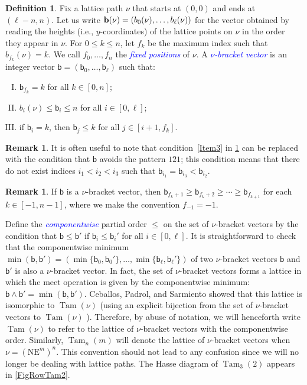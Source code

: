 \documentclass[11pt]{amsart}
\theoremstyle{definition}
\newtheorem{definition}[theorem]{Definition}
\newtheorem{remark}[theorem]{Remark}
\DeclareMathOperator{\Tam}{Tam}
\newcommand{\dfn}[1]{\textcolor{blue}{\emph{#1}}}
\begin{document}
\begin{definition}\label{DefMeet2}
Fix a lattice path $\nu$ that starts at $(0,0)$ and ends at $(\ell-n,n)$. Let us write ${{\bf b}(\nu)=(b_0(\nu),\ldots,b_{\ell}(\nu))}$ for the vector obtained by reading the heights (i.e., $y$-coordinates) of the lattice points on $\nu$ in the order they appear in $\nu$. For $0\leq k\leq n$, let $f_k$ be the maximum index such that $b_{f_k}(\nu)=k$. We call $f_0,\ldots,f_n$ the \dfn{fixed positions} of $\nu$. A \dfn{$\nu$-bracket vector} is an integer vector $\mathsf{b}=(\mathsf b_0,\ldots,\mathsf b_{\ell})$ such that:
\begin{enumerate}[(I)]
\item $\mathsf b_{f_k}=k$ for all $k\in[0,n]$; 
\item\label{Item2} $b_i(\nu)\leq \mathsf b_i\leq n$ for all $i\in[0,\ell]$;
\item\label{Item3} if $\mathsf b_i=k$, then $\mathsf b_j\leq k$ for all $j\in[i+1, f_k]$. 
\end{enumerate} 
\end{definition}

\begin{remark}\label{rem:121}
    It is often useful to note that condition~\eqref{Item3} in \cref{DefMeet2} can be replaced with the condition that $\mathsf b$ avoids the pattern $121$; this condition means that there do not exist indices $i_1<i_2<i_3$ such that $\mathsf b_{i_1}=\mathsf b_{i_3}<\mathsf b_{i_2}$. 
\end{remark}

\begin{remark}\label{rem:decreasing}
If $\mathsf b$ is a $\nu$-bracket vector, then ${\mathsf b_{f_k+1}\geq\mathsf b_{f_k+2}\geq\cdots\geq\mathsf b_{f_{k+1}}}$ for each $k\in[-1,n-1]$, where we make the convention $f_{-1}=-1$. 
\end{remark}

Define the \dfn{componentwise} partial order $\leq$ on the set of $\nu$-bracket vectors by the condition that $\mathsf b\leq\mathsf b'$ if $\mathsf b_i\leq\mathsf b_i'$ for all $i\in[0,\ell]$. It is straightforward to check that the componentwise minimum $\min(\mathsf{b},\mathsf{b}')=(\min\{\mathsf b_0,\mathsf b_0'\},\ldots,\min\{\mathsf b_{\ell},\mathsf b_{\ell}'\})$ of two $\nu$-bracket vectors $\mathsf b$ and $\mathsf b'$ is also a $\nu$-bracket vector. In fact, the set of $\nu$-bracket vectors forms a lattice in which the meet operation is given by the componentwise minimum: $\mathsf b\wedge\mathsf b'=\min(\mathsf b,\mathsf b')$. Ceballos, Padrol, and Sarmiento \cite{Ceballos2} showed that this lattice is isomorphic to $\Tam(\nu)$ (using an explicit bijection from the set of $\nu$-bracket vectors to $\Tam(\nu)$ ). Therefore, by abuse of notation, we will henceforth write $\Tam(\nu)$ to refer to the lattice of $\nu$-bracket vectors with the componentwise order. Similarly, $\Tam_n(m)$ will denote the lattice of $\nu$-bracket vectors when $\nu=(\text{N}\text{E}^m)^n$. This convention should not lead to any confusion since we will no longer be dealing with lattice paths. The Hasse diagram of $\Tam_3(2)$ appears in \cref{FigRowTam2}.  
\end{document}
